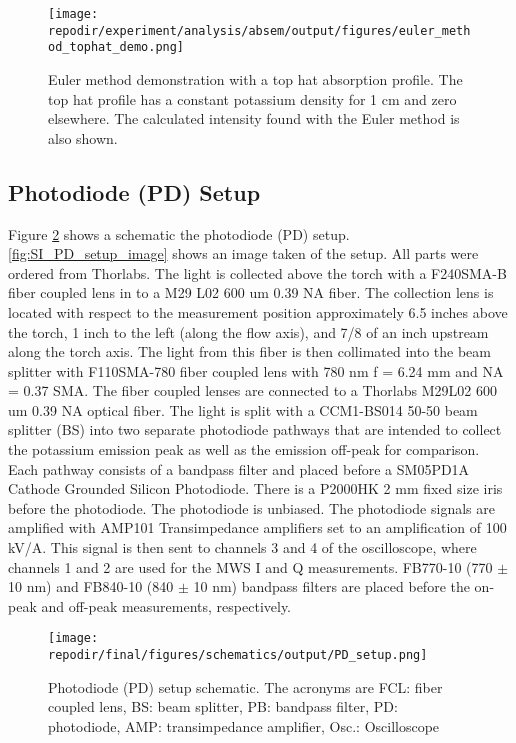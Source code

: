 \begin{figure}[]
    \centering
    \texttt{[image: \\repodir/experiment/analysis/absem/output/figures/euler\_method\_tophat\_demo.png]}
    \caption{Euler method demonstration with a top hat absorption profile. The top hat profile has a constant potassium density for 1 cm and zero elsewhere. The calculated intensity found with the Euler method is also shown.}
    \label{fig:SI_euler_method_tophat_demo}
\end{figure}

\subsection{Photodiode (PD) Setup}

Figure \ref{fig:SI_PD_setup_schematic} shows a schematic the photodiode (PD) setup. \ref{fig:SI_PD_setup_image} shows an image taken of the setup. All parts were ordered from Thorlabs. The light is collected above the torch with a F240SMA-B fiber coupled lens in to a M29 L02 600 um 0.39 NA fiber. The collection lens is located with respect to the measurement position approximately 6.5 inches above the torch, 1 inch to the left (along the flow axis), and 7/8 of an inch upstream along the torch axis. The light from this fiber is  then collimated into the beam splitter with F110SMA-780 fiber coupled lens with 780 nm f = 6.24 mm and NA = 0.37 SMA. The fiber coupled lenses are connected to a Thorlabs M29L02 600 um 0.39 NA optical fiber. The light is split with a CCM1-BS014 50-50 beam splitter (BS) into two separate photodiode pathways that are intended to collect the potassium emission peak as well as the emission off-peak for comparison. Each pathway consists of a bandpass filter and placed before a SM05PD1A Cathode Grounded Silicon Photodiode. There is a P2000HK 2 mm fixed size iris before the photodiode. The photodiode is unbiased.   The photodiode signals are amplified with AMP101 Transimpedance amplifiers set to an amplification of 100 kV/A. This signal is then sent to channels 3 and 4 of the oscilloscope, where channels 1 and 2 are used for the MWS  I and Q measurements.  FB770-10 (770 $\pm$ 10 nm) and FB840-10 (840 $\pm$ 10 nm) bandpass filters are placed before the on-peak and off-peak measurements, respectively. 



\begin{figure}[]
    \centering
    \texttt{[image: \\repodir/final/figures/schematics/output/PD\_setup.png]}
    \caption{Photodiode (PD) setup schematic. The acronyms are FCL: fiber coupled lens, BS: beam splitter, PB: bandpass filter, PD: photodiode, AMP: transimpedance amplifier, Osc.: Oscilloscope}
    \label{fig:SI_PD_setup_schematic}
\end{figure}



